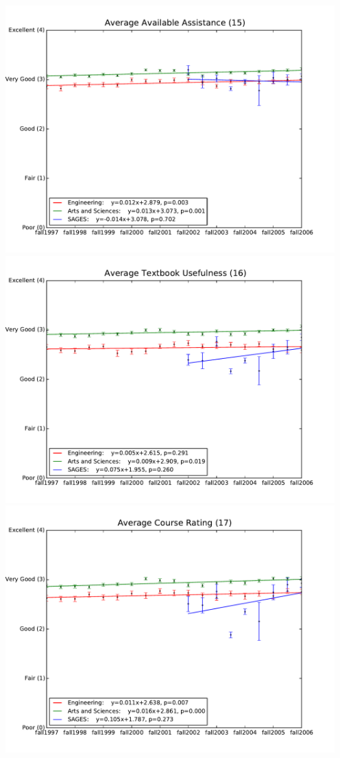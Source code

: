 \documentclass[12pt]{article}
\begin{document}
\begin{center}
    \includegraphics[width=5in]{figures/15_assistance_over_time.pdf} \\
    \includegraphics[width=5in]{figures/16_textbook_over_time.pdf} \\
    \includegraphics[width=5in]{figures/17_rating_over_time.pdf} \\

\end{center}
\end{document}
